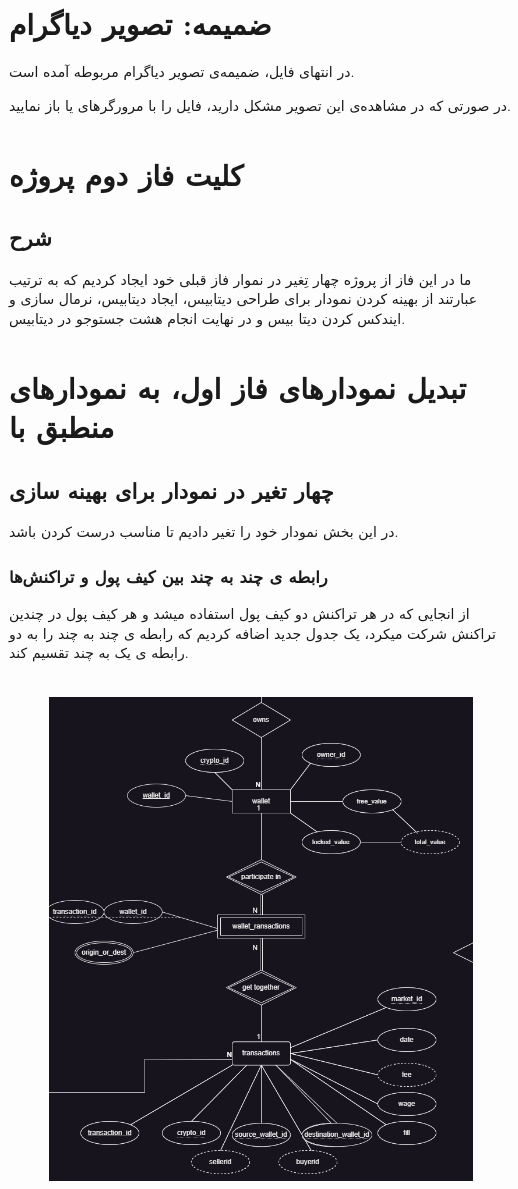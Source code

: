 \documentclass{book}
\begin{document}
\chapter{ضمیمه: تصویر دیاگرام }
در انتهای فایل، ضمیمه‌ی تصویر دیاگرام مربوطه آمده است.

در صورتی که در مشاهده‌ی این تصویر مشکل دارید، فایل  را با مرورگرهای  یا  باز نمایید.


\chapter{کلیت فاز دوم پروژه}
\section{شرح}
ما در این فاز از پروژه چهار تِغیر در نموار فاز قبلی خود ایجاد کردیم که به ترتیب عبارتند از بهینه کردن نمودار برای طراحی دیتابیس، ایجاد دیتابیس، نرمال سازی و ایندکس کردن دیتا بیس و در نهایت انجام هشت جستوجو در دیتابیس.
\chapter{تبدیل نمودار‌های‌‌ فاز اول، به نمودار‌های منطبق با }
\section{چهار تغیر در نمودار برای بهینه سازی}
در این بخش نمودار خود را تغیر دادیم تا مناسب درست کردن  باشد.
\newpage

\subsection{رابطه ی چند به چند بین کیف پول و تراکنش‌ها}
از انجایی که در هر تراکنش دو کیف پول استفاده میشد و هر کیف پول در چندین تراکنش شرکت میکرد، یک جدول جدید اضافه کردیم که رابطه ی چند به چند را به دو رابطه ی یک به چند تقسیم کند.
\\ \\
\begin{figure}[h]
    \centering
    \includegraphics[width=0.5\linewidth]{wallets_transactions.png}
\end{figure}
\end{document}
